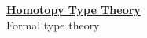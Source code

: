 \documentclass[hott-all.tex]{subfiles}
\begin{document}
\begin{center}
  {\Large{\underline{\textbf{Homotopy Type Theory}}}} \\[2mm]
  {\large Formal type theory}
\end{center}

\appendix
\renewcommand{\thechapter}{A}


%
%
%
\end{document}
